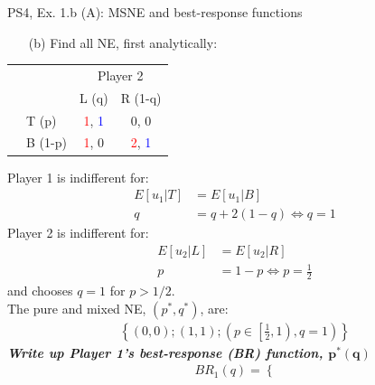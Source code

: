 \begin{frame}{PS4, Ex. 1.b (A): MSNE and best-response functions}
  \begin{multicols}{2}
    \begin{itemize}
      \item[(b)] Find all NE, first analytically:
    \end{itemize}
    \vspace{-8pt}
    \begin{table}
      \begin{tabular}{cl|c|c|}
        & \multicolumn{1}{c}{} & \multicolumn{2}{c}{\color{blue}Player 2}\\
        \parbox[t]{1mm}{}
        &  &  &  \\
        & T (p) & \textcolor{red}{1}, \textcolor{blue}{1} & 0, 0 \\
        & B (1-p) & \textcolor{red}{1}, 0 & \textcolor{red}{2}, \textcolor{blue}{1} \\
      \end{tabular}
    \end{table}
    Player 1 is indifferent for:
    \begin{align*}
      E[u_1|T]&=E[u_1|B]\\
      q &= q + 2(1-q) \Leftrightarrow q = 1
    \end{align*}
    Player 2 is indifferent for:
    \begin{align*}
      E[u_2|L]&=E[u_2|R]\\
      p &= 1-p \Leftrightarrow p = \frac{1}{2}
    \end{align*}
    and chooses $q=1$ for $p>1/2$.\\\medskip
    The pure and mixed NE, $(p^{*},q^{*})$, are:
    \begin{align*}
      \left\{(0,0);(1,1);\left(p\in\left[\frac{1}{2},1\right),q=1\right)\right\}
    \end{align*}
    \textbf{\textit{Write up Player 1's best-response (BR) function, $\bm{p^{*}(q)}$}}
  \vfill\null \columnbreak
    \begin{align*}
      BR_1(q)=\left\{ \right.
    \end{align*}
  \vfill\null
  \end{multicols}
\end{frame}
